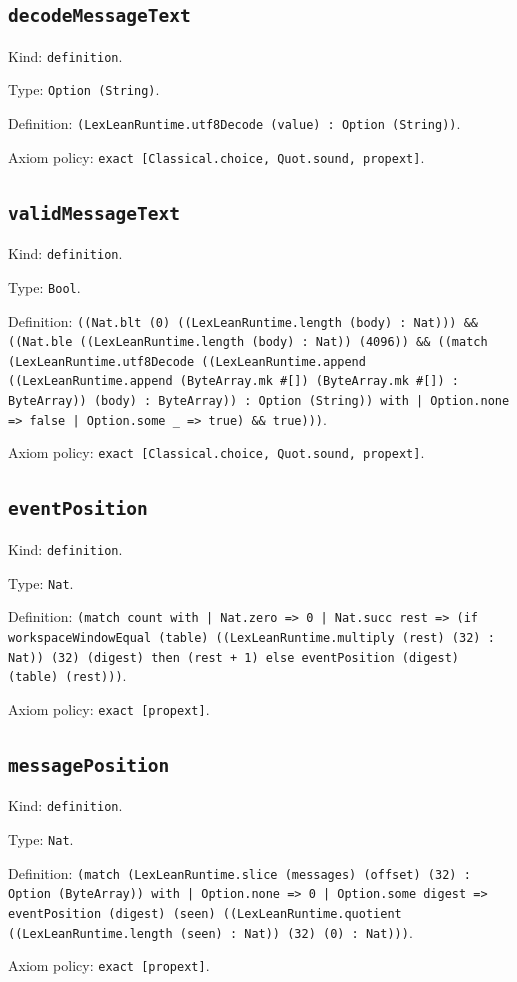 \documentclass[11pt]{article}
\begin{document}
\subsection*{\texttt{decodeMessageText}}
\noindent Kind: \texttt{definition}.\par
\noindent Type: \texttt{Option (String)}.\par
\noindent Definition: \texttt{(LexLeanRuntime.utf8Decode (value) : Option (String))}.\par
\noindent Axiom policy: \texttt{exact [Classical.choice, Quot.sound, propext]}.\par
\subsection*{\texttt{validMessageText}}
\noindent Kind: \texttt{definition}.\par
\noindent Type: \texttt{Bool}.\par
\noindent Definition: \texttt{((Nat.blt (0) ((LexLeanRuntime.length (body) : Nat))) \&\& ((Nat.ble ((LexLeanRuntime.length (body) : Nat)) (4096)) \&\& ((match (LexLeanRuntime.utf8Decode ((LexLeanRuntime.append ((LexLeanRuntime.append (ByteArray.mk \#[]) (ByteArray.mk \#[]) : ByteArray)) (body) : ByteArray)) : Option (String)) with | Option.none => false | Option.some \_ => true) \&\& true)))}.\par
\noindent Axiom policy: \texttt{exact [Classical.choice, Quot.sound, propext]}.\par
\subsection*{\texttt{eventPosition}}
\noindent Kind: \texttt{definition}.\par
\noindent Type: \texttt{Nat}.\par
\noindent Definition: \texttt{(match count with | Nat.zero => 0 | Nat.succ rest => (if workspaceWindowEqual (table) ((LexLeanRuntime.multiply (rest) (32) : Nat)) (32) (digest) then (rest + 1) else eventPosition (digest) (table) (rest)))}.\par
\noindent Axiom policy: \texttt{exact [propext]}.\par
\subsection*{\texttt{messagePosition}}
\noindent Kind: \texttt{definition}.\par
\noindent Type: \texttt{Nat}.\par
\noindent Definition: \texttt{(match (LexLeanRuntime.slice (messages) (offset) (32) : Option (ByteArray)) with | Option.none => 0 | Option.some digest => eventPosition (digest) (seen) ((LexLeanRuntime.quotient ((LexLeanRuntime.length (seen) : Nat)) (32) (0) : Nat)))}.\par
\noindent Axiom policy: \texttt{exact [propext]}.\par
\end{document}
